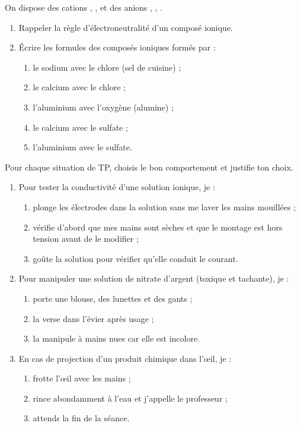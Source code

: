 \documentclass[11pt]{article}
\begin{document}
\begin{exercice}
On dispose des cations , ,  et des anions , , .
\begin{enumerate}
\item Rappeler la règle d'électroneutralité d'un composé ionique.
\item Écrire les formules des composés ioniques formés par :
\begin{enumerate}
\item le sodium avec le chlore (sel de cuisine) ;
\item le calcium avec le chlore ;
\item l'aluminium avec l'oxygène (alumine) ;
\item le calcium avec le sulfate ;
\item l'aluminium avec le sulfate.
\end{enumerate}
\end{enumerate}
\end{exercice}

\begin{exercice}
Pour chaque situation de TP, choisis le bon comportement et justifie ton choix.
\begin{enumerate}
\item Pour tester la conductivité d'une solution ionique, je :
\begin{enumerate}
\item plonge les électrodes dans la solution sans me laver les mains mouillées ;
\item vérifie d'abord que mes mains sont sèches et que le montage est hors tension avant de le modifier ;
\item goûte la solution pour vérifier qu'elle conduit le courant.
\end{enumerate}
\item Pour manipuler une solution de nitrate d'argent (toxique et tachante), je :
\begin{enumerate}
\item porte une blouse, des lunettes et des gants ;
\item la verse dans l'évier après usage ;
\item la manipule à mains nues car elle est incolore.
\end{enumerate}
\item En cas de projection d'un produit chimique dans l'œil, je :
\begin{enumerate}
\item frotte l'œil avec les mains ;
\item rince abondamment à l'eau et j'appelle le professeur ;
\item attends la fin de la séance.
\end{enumerate}
\end{enumerate}
\end{exercice}
\end{document}
